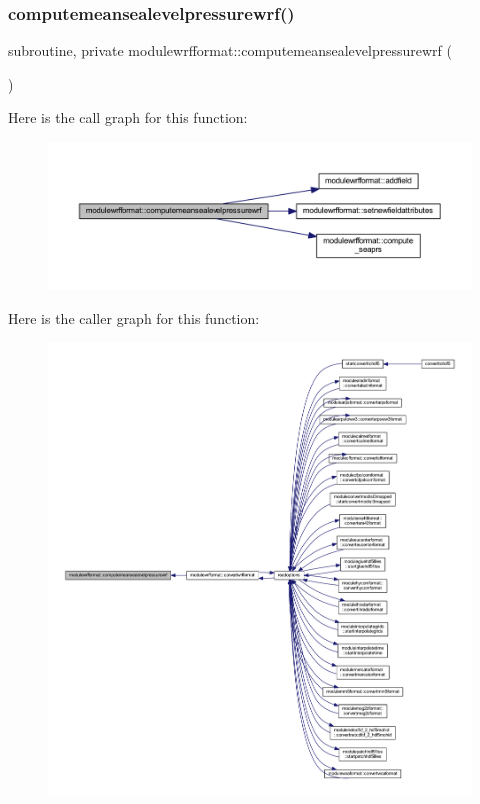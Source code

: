 \subsubsection{\texorpdfstring{computemeansealevelpressurewrf()}{computemeansealevelpressurewrf()}}
{\footnotesize\ttfamily subroutine, private modulewrfformat\+::computemeansealevelpressurewrf (\begin{DoxyParamCaption}{ }\end{DoxyParamCaption})\hspace{0.3cm}{\ttfamily [private]}}

Here is the call graph for this function\+:\nopagebreak
\begin{figure}[H]
\begin{center}
\leavevmode
\includegraphics[width=350pt]{namespacemodulewrfformat_afda201375ff1c4cfb0d863734c03535c_cgraph}
\end{center}
\end{figure}
Here is the caller graph for this function\+:\nopagebreak
\begin{figure}[H]
\begin{center}
\leavevmode
\includegraphics[width=350pt]{namespacemodulewrfformat_afda201375ff1c4cfb0d863734c03535c_icgraph}
\end{center}
\end{figure}
\mbox{\label{namespacemodulewrfformat_a1c8f24f66c6b703ada552c472d71569d}} 

